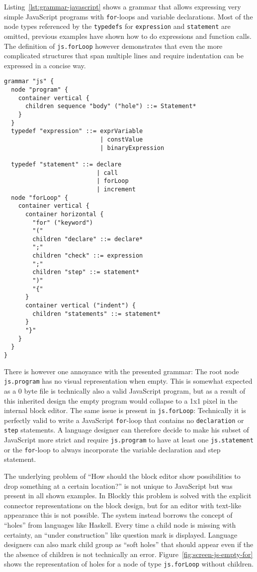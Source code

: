 \documentclass[sigconf,natbib=false]{acmart}
\newcommand{\enquote}[1]{``#1''}
\begin{document}
Listing~\ref{lst:grammar-javascript} shows a grammar that allows expressing very simple JavaScript programs with \texttt{for}-loops and variable declarations. Most of the node types referenced by the \texttt{typedefs} for \texttt{expression} and \texttt{statement} are omitted, previous examples have shown how to do expressions and function calls. The definition of \texttt{js.forLoop} however demonstrates that even the more complicated structures that span multiple lines and require indentation can be expressed in a concise way.

\begin{lstlisting}[float,caption={Semantic \& syntactic structure for a \texttt{JavaScript} subset}, label=lst:grammar-javascript]
grammar "js" {
  node "program" {
    container vertical {
      children sequence "body" ("hole") ::= Statement*
    }
  }
  typedef "expression" ::= exprVariable
                           | constValue
                           | binaryExpression

  typedef "statement" ::= declare
                          | call
                          | forLoop
                          | increment
  node "forLoop" {
    container vertical {
      container horizontal {
        "for" ("keyword")
        "("
        children "declare" ::= declare*
        ";"
        children "check" ::= expression
        ";"
        children "step" ::= statement*
        ")"
        "{"
      }
      container vertical ("indent") {
        children "statements" ::= statement*
      }
      "}"
    }
  }
}
\end{lstlisting}

There is however one annoyance with the presented grammar: The root node \texttt{js.program} has no visual representation when empty. This is somewhat expected as a 0 byte file is technically also a valid JavaScript program, but as a result of this inherited design the empty program would collapse to a 1x1 pixel in the internal block editor. The same issue is present in \texttt{js.forLoop}: Technically it is perfectly valid to write a JavaScript \texttt{for}-loop that contains no \texttt{declaration} or \texttt{step} statements. A language designer can therefore decide to make his subset of JavaScript more strict and require \texttt{js.program} to have at least one \texttt{js.statement} or the \texttt{for}-loop to always incorporate the variable declaration and step statement.

The underlying problem of \enquote{How should the block editor show possibilities to drop something at a certain location?} is not unique to JavaScript but was present in all shown examples. In Blockly this problem is solved with the explicit connector representations on the block design, but for an editor with text-like appearance this is not possible. The system instead borrows the concept of \enquote{holes} from languages like Haskell. Every time a child node is missing with certainty, an \enquote{under construction} like question mark is displayed. Language designers can also mark child group as \enquote{soft holes} that should appear even if the the absence of children is not technically an error. Figure~\ref{fig:screen-js-empty-for} shows the representation of holes for a node of type \texttt{js.forLoop} without children.
\end{document}
